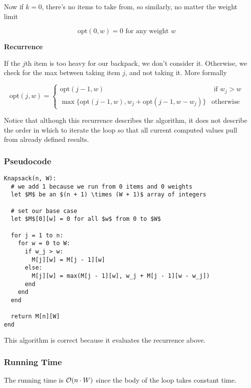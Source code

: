 \documentclass[12pt]{article}
\def\opt{\text{opt}}
\begin{document}

  Now if $k = 0$, there's no items to take from, so similarly, no matter the
  weight limit

  \[
    \opt(0, w) = 0 \text{ for any weight $w$}
  \]

  {\bf Recurrence}

  If the $j$th item is too heavy for our backpack, we don't consider it.
  Otherwise, we check for the max between taking item $j$, and not taking it.
  More formally

  \[
    \opt(j, w) = \begin{cases}
      \opt(j - 1, w) & \text{ if $w_j > w$} \\
      \max \big\{ \opt(j - 1, w), w_j + \opt(j - 1, w - w_j)\big\} &\text{otherwise}
    \end{cases}
  \]

  Notice that although this recurrence describes the algorithm, it does not
  describe the order in which to iterate the loop so that all current computed
  values pull from already defined results.

  \subsubsection{Pseudocode}

  \begin{lstlisting}
Knapsack(n, W):
  # we add 1 because we run from 0 items and 0 weights
  let $M$ be an $(n + 1) \times (W + 1)$ array of integers

  # set our base case
  let $M$[0][w] = 0 for all $w$ from 0 to $W$

  for j = 1 to n:
    for w = 0 to W:
      if w_j > w:
        M[j][w] = M[j - 1][w]
      else:
        M[j][w] = max(M[j - 1][w], w_j + M[j - 1][w - w_j])
      end
    end
  end

  return M[n][W]
end
  \end{lstlisting}

  This algorithm is correct because it evaluates the recurrence above.

  \subsubsection{Running Time}

  The running time is $\mathcal O(n \cdot W)$ since the body of the loop takes constant
  time.
\end{document}
